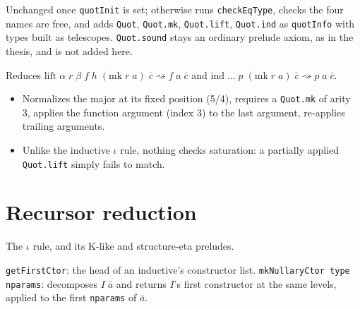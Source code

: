 \begin{definition}
\label{def:kernel-add-quot}
\leanok
{}

 Unchanged once \texttt{quotInit} is set; otherwise runs \texttt{checkEqType},
checks the four names are free, and adds \texttt{Quot}, \texttt{Quot.mk}, \texttt{Quot.lift},
\texttt{Quot.ind} as \texttt{quotInfo} with types built as telescopes. \texttt{Quot.sound} stays
an ordinary prelude axiom, as in the thesis, and is not added here.
\end{definition}

\begin{definition}
\label{def:kernel-quot-reduce-rec}
\leanok
{}

 Reduces $\mathrm{lift}\;\alpha\;r\;\beta\;f\;h\;(\mathrm{mk}\;r\;a)\;\bar c
\rightsquigarrow f\;a\;\bar c$ and $\mathrm{ind}\;\dots\;p\;(\mathrm{mk}\;r\;a)\;\bar c
\rightsquigarrow p\;a\;\bar c$.
\begin{itemize}
\item Normalizes the major at its fixed position (5/4), requires a \texttt{Quot.mk} of arity 3,
applies the function argument (index 3) to the last argument, re-applies trailing arguments.
\item {} Unlike the inductive $\iota$ rule, nothing checks saturation: a partially
applied \texttt{Quot.lift} simply fails to match.
\end{itemize}
\end{definition}

\section{Recursor reduction}

The $\iota$ rule, and its K-like and structure-eta preludes.

\begin{definition}
\label{def:kernel-get-first-ctor}
\leanok
{} \texttt{getFirstCtor}: the head of an inductive's constructor list.
\texttt{mkNullaryCtor type nparams}: decomposes $I\;\bar a$ and returns $I$'s first constructor at
the same levels, applied to the first \texttt{nparams} of $\bar a$.
\end{definition}

